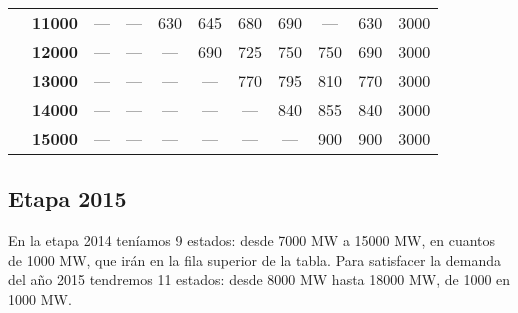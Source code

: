 \documentclass[12pt,a4paper,twoside,openright,titlepage,final]{article}
\begin{document}
\begin{table}[htbp!]
{\begin{tabular}{|ccccccccccc|}
\multicolumn{1}{|c|}{}                                & \textbf{11000}        & ---           & ---           & 630           & 645           & 680            & 690            & ---            & 630                                                                 & 3000                                                                  \\
\multicolumn{1}{|c|}{}                                & \textbf{12000}        & ---           & ---           & ---           & 690           & 725            & 750            & 750            & 690                                                                 & 3000                                                                  \\
\multicolumn{1}{|c|}{}                                & \textbf{13000}        & ---           & ---           & ---           & ---           & 770            & 795            & 810            & 770                                                                 & 3000                                                                  \\
\multicolumn{1}{|c|}{}                                & \textbf{14000}        & ---           & ---           & ---           & ---           & ---            & 840            & 855            & 840                                                                 & 3000                                                                  \\
\multicolumn{1}{|c|}{}                                & \textbf{15000}        & ---           & ---           & ---           & ---           & ---            & ---            & 900            & 900                                                                 & 3000                                                                  \\ \hline
\end{tabular}
}
\end{table}



\subsection{Etapa 2015}

En la etapa 2014 teníamos 9 estados: desde 7000 MW a 15000 MW, en cuantos de 1000 MW, que irán en la fila superior de la tabla. Para satisfacer la demanda del año 2015 tendremos 11 estados: desde 8000 MW hasta 18000 MW, de 1000 en 1000 MW.\\
\end{document}
